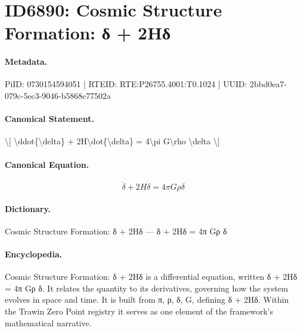 \section*{ID6890: Cosmic Structure Formation: δ + 2Hδ}
\paragraph{Metadata.}
PiID: 0730154594051 | RTEID: RTE:P26755.4001:T0.1024 | UUID: 2bbd0ea7-079c-5ec3-9046-b5868e77502a

\paragraph{Canonical Statement.}
\textbackslash{}[ \textbackslash{}ddot\{\textbackslash{}delta\} + 2H\textbackslash{}dot\{\textbackslash{}delta\} = 4\textbackslash{}pi G\textbackslash{}rho \textbackslash{}delta \textbackslash{}]

\paragraph{Canonical Equation.}
\[
\ddot{\delta} + 2H\dot{\delta} = 4\pi G\rho \delta
\]

\paragraph{Dictionary.}
Cosmic Structure Formation: δ + 2Hδ — δ + 2Hδ = 4π Gρ δ

\paragraph{Encyclopedia.}
Cosmic Structure Formation: δ + 2Hδ is a differential equation, written δ + 2Hδ = 4π Gρ δ. It relates the quantity to its derivatives, governing how the system evolves in space and time. It is built from π, ρ, δ, G, defining δ + 2Hδ. Within the Trawin Zero Point registry it serves as one element of the framework's mathematical narrative.
